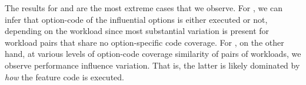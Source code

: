 {The results for \dconvert and \jadx are the most extreme cases that we observe. For \jadx, we can infer that option-code of the influential options is either executed or not, depending on the workload since most substantial variation is present for workload pairs that share no option-specific code coverage. For \dconvert, on the other hand, at various levels of option-code coverage similarity of pairs of workloads, we observe performance influence variation. That is, the latter is likely dominated by \textit{how} the feature code is executed.\\


\begin{figure}


\end{figure}}
